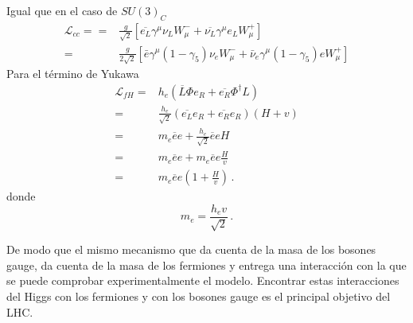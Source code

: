 Igual que en el caso de $SU(3)_C$
\begin{align}
  \mathcal{L}_{cc}=
  =&\frac{g}{\sqrt{2}}\left[\overline{e_L}\gamma^\mu\nu_L W_\mu^-+\overline{\nu_L}\gamma^\mu e_L W_\mu^+\right]\nonumber\\
  =&\frac{g}{2\sqrt{2}}\left[\bar{e}\gamma^\mu(1-\gamma_5)\nu_e W_\mu^-+\bar{\nu}_e\gamma^\mu(1-\gamma_5)e W_\mu^+\right]
\end{align}
Para el t\'ermino de Yukawa
\begin{align}
  \mathcal{L}_{fH}=&h_e \left(\overline{L}\Phi e_R+\overline{e_R}\Phi^\dagger L\right)\nonumber\\
  =&\frac{h_e}{\sqrt{2}} \left(\overline{e_L}e_R+\overline{e_R}e_R\right)(H+v)\nonumber\\
  =&m_e\overline{e}e+\frac{h_e}{\sqrt{2}}\overline{e}e H\nonumber\\
  =&m_e\overline{e}e+{m_e}\overline{e}e \frac{H}{v}\nonumber\\
  =&m_e\overline{e}e\left(1+\frac{H}{v}\right) \,.
\end{align}
donde
\begin{equation}
  m_e=\frac{h_e v}{\sqrt{2}}\,.
\end{equation}

De modo que el mismo mecanismo que da cuenta de la masa de los bosones gauge, da cuenta de la masa de los fermiones y entrega una interacci\'on con la que se puede comprobar experimentalmente el modelo. Encontrar estas interacciones del Higgs con los fermiones y con los bosones gauge es el principal objetivo del LHC. 

